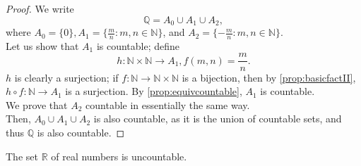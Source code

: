 \documentclass[12pt]{article}
\begin{document}
\begin{proof}
  We write $$\mathbb{Q}= A_0 \cup A_1 \cup A_2,$$ where $A_0 = \{0\}, A_1 = \{\frac{m}{n} : m,n \in \mathbb{N}\}$, and $A_2 = \{- \frac{m}{n}: m,n \in \mathbb{N}\}$.\\
  Let us show that $A_1$ is countable; define $$h: \mathbb{N} \times \mathbb{N} \to A_1, f(m,n) = \frac{m}{n}.$$ $h$ is clearly a surjection; if $f : \mathbb{N} \to \mathbb{N} \times \mathbb{N}$ is a bijection, then by \cref{prop:basicfactII}, $h \circ f : \mathbb{N} \to A_1$ is a surjection. By \cref{prop:equivcountable}, $A_1$ is countable.\\
  We prove that $A_2$ countable in essentially the same way.\\
  Then, $A_0 \cup A_1 \cup A_2$ is also countable, as it is the union of countable sets, and thus $\mathbb{Q}$ is also countable.
\end{proof}
\newpage
\begin{theorem}
  The set $\mathbb{R}$ of real numbers is uncountable.\footnotemark
\end{theorem}
\end{document}
